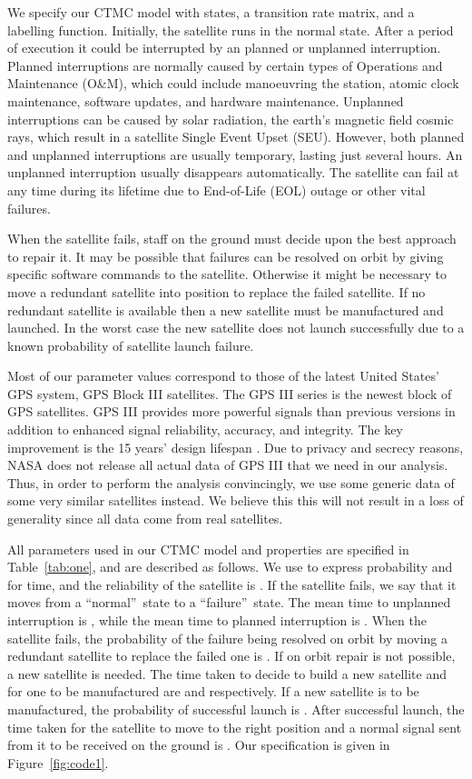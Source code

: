 \documentclass[preprint,12pt]{qrei}
\begin{document}
We specify our CTMC model with states, a transition rate matrix, and a labelling function. Initially, the satellite runs in the normal state. After a period of execution it could be interrupted by an planned or unplanned interruption. Planned interruptions are normally caused by certain types of Operations and Maintenance (O\&M), which could include manoeuvring the station, atomic clock maintenance, software updates, and hardware maintenance. Unplanned interruptions can be caused by solar radiation, the earth's magnetic field cosmic rays, which result in a satellite Single Event Upset (SEU). However, both planned and unplanned interruptions are usually temporary, lasting just several hours. An unplanned interruption usually disappears automatically. The satellite can fail at any time during its lifetime due to End-of-Life (EOL) outage or other vital failures.

When the satellite fails, staff on the ground must decide upon the best approach to repair it. It may be possible that failures can be resolved on orbit by giving specific software commands to the satellite. Otherwise it might be necessary to move a redundant satellite into position to replace the failed satellite. If no redundant satellite is available then a new satellite must be manufactured and launched. In the worst case the new satellite does not launch successfully due to a known probability of satellite launch failure.

Most of our parameter values correspond to those of the latest United States' GPS system, GPS Block III satellites. The GPS III series is the newest block of GPS satellites. GPS III provides more powerful signals than previous versions in addition to enhanced signal reliability, accuracy, and integrity. The key improvement is the 15 years' design lifespan \cite{NOA13}. Due to privacy and secrecy reasons, NASA does not release all actual data of GPS III that we need in our analysis. Thus, in order to perform the analysis convincingly, we use some generic data of some very similar satellites instead. We believe this this will not result in a loss of generality since all data come from real satellites.

All parameters used in our CTMC model and properties are specified in Table~\ref{tab:one}, and are described as follows. We use  to express probability and  for time, and the reliability of the satellite is . If the satellite fails, we say that it moves from a \textquotedblleft normal\textquotedblright\ state to a \textquotedblleft failure\textquotedblright\ state. The mean time to unplanned interruption is , while the mean time to planned interruption is . When the satellite fails, the probability of the failure being resolved on orbit by moving a redundant satellite to replace the failed one is . If on orbit repair is not possible, a new satellite is needed. The time taken to decide to build a new satellite and for one to be manufactured are  and  respectively. If a new satellite is to be manufactured, the probability of successful launch is . After successful launch, the time taken for the satellite to move to the right position and a normal signal sent from it to be received on the ground is . Our  specification is given in Figure~\ref{fig:code1}.
\end{document}
